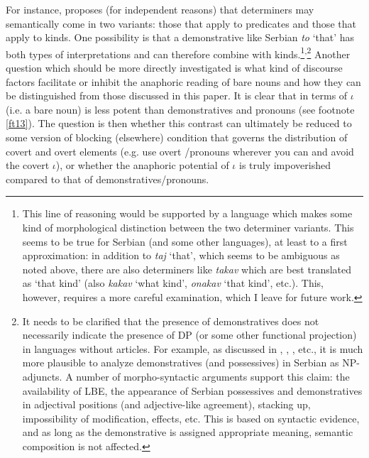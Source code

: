 \documentclass[output=paper,
modfonts
]{langscibook}
\begin{document}
{	} For instance, \citet[353]{Chierchia1998} proposes (for independent reasons) that determiners may semantically come in two variants: those that apply to predicates and those that apply to kinds. One possibility is that a demonstrative like Serbian \textit{to} `that' has both types of interpretations and can therefore combine with kinds.\footnote{This line of reasoning would be supported by a language which makes some kind of morphological distinction between the two determiner variants. This seems to be true for Serbian (and some other  languages), at least to a first approximation: in addition to \textit{taj} `that', which seems to be ambiguous as noted above, there are also determiners like \textit{takav} which are best translated as `that kind' (also \textit{kakav} `what kind', \textit{onakav} `that kind', etc.). This, however, requires a more careful examination, which I leave for future work.}\textsuperscript{,}\footnote{It needs to be clarified that the presence of demonstratives does not necessarily indicate the presence of DP (or some other functional projection) in languages without articles. For example, as discussed in \citet{Boskovic2005}, \citet{Despic2011,Despic2013}, \citet{Zlatic1997}, etc., it is much more plausible to analyze demonstratives (and possessives) in Serbian as NP-adjuncts. A number of morpho-syntactic arguments support this claim: the availability of LBE, the appearance of Serbian possessives and demonstratives in adjectival positions (and adjective-like agreement), stacking up, impossibility of modification,  effects, etc. This is based on syntactic evidence, and as long as the demonstrative is assigned appropriate meaning, semantic composition is not affected.} Another question which should be more directly investigated is what kind of discourse factors facilitate or inhibit the anaphoric reading of bare nouns and how they can be distinguished from those discussed in this paper. 
	It is clear that in terms of  $\iota$ (i.e. a bare noun) is less potent than demonstratives and pronouns (see footnote \ref{ft13}). The question is then whether this contrast can ultimately be reduced to some version of blocking (elsewhere) condition that governs the distribution of covert and overt elements (e.g. use overt /pronouns wherever you can and avoid the covert $\iota$), or whether the anaphoric potential of $\iota$ is truly impoverished compared to that of demonstratives/pronouns. 
	
\end{document}
